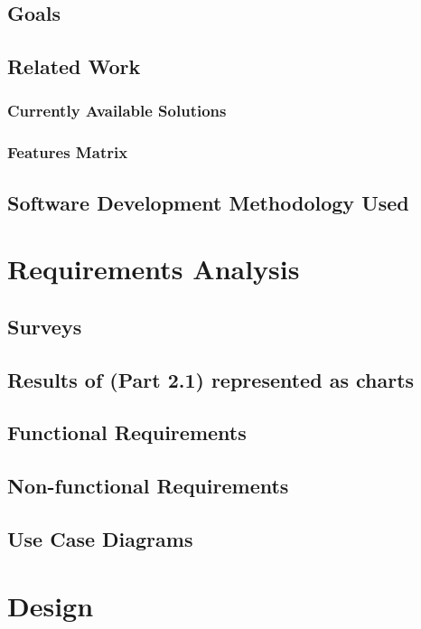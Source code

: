 \documentclass{book}
\begin{document}
    \section{Goals}
		
		\section{Related Work}
			\subsection{Currently Available Solutions}
			
			\subsection{Features Matrix}
			
		\section{Software Development Methodology Used}
	
	\chapter{Requirements Analysis}
		\section{Surveys}
		
		\section{Results of (Part 2.1) represented as charts}
		
		\section{Functional Requirements}
		
		\section{Non-functional Requirements}
		
		\section{Use Case Diagrams}
	
	\chapter{Design}
\end{document}
